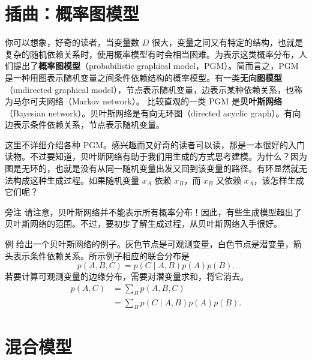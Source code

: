 \section{插曲：概率图模型}
你可以想象，好奇的读者，当变量数 $D$ 很大，变量之间又有特定的结构，也就是复杂的随机依赖关系时，使用概率模型有时会相当困难。为表示这类概率分布，人们提出了\textbf{概率图模型}（probabilistic graphical model，PGM）。简而言之，PGM 是一种用图表示随机变量之间条件依赖结构的概率模型。有一类\textbf{无向图模型}（undirected graphical model），节点表示随机变量，边表示某种依赖关系，也称为马尔可夫网络（Markov network）。
比较直观的一类 PGM 是\textbf{贝叶斯网络}（Bayesian network）。贝叶斯网络是有向无环图（directed acyclic graph）。有向边表示条件依赖关系，节点表示随机变量。

这里不详细介绍各种 PGM。感兴趣而又好奇的读者可以读，那是一本很好的入门读物。不过要知道，贝叶斯网络有助于我们用生成的方式思考建模。为什么？因为图是无环的，也就是没有从同一随机变量出发又回到该变量的路径。有环显然就无法构成这种生成过程。如果随机变量 $x_A$ 依赖 $x_B$，而 $x_B$ 又依赖 $x_A$，该怎样生成它们呢？

\begin{booknote}{旁注}
请注意，贝叶斯网络并不能表示所有概率分布！因此，有些生成模型超出了贝叶斯网络的范围。不过，要初步了解生成过程，从贝叶斯网络入手很好。
\end{booknote}

\begin{booknote}{例}
给出一个贝叶斯网络的例子。灰色节点是可观测变量，白色节点是潜变量，箭头表示条件依赖关系。所示例子相应的联合分布是
\begin{equation}
p(A,B,C)=p(C\mid A,B)p(A)p(B).
\tag{2.16}\label{eq:02-16}
\end{equation}
若要计算可观测变量的边缘分布，需要对潜变量求和，将它消去。
\begin{align}
p(A,C)&=\sum_B p(A,B,C) \tag{2.17}\label{eq:02-17}\\
 &=\sum_B p(C\mid A,B)p(A)p(B). \tag{2.18}\label{eq:02-18}
\end{align}
\end{booknote}


\section{混合模型}
